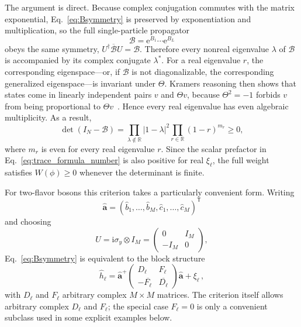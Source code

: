 \documentclass[twocolumn,aps,prb,10pt,amsmath,amssymb,amsthm,superscriptaddress]{revtex4-2}
\newcommand{\ee}{\mathrm{e}}
\newcommand{\ii}{\mathrm{i}}
\newcommand{\trans}{\mathsf{T}}
\newcommand{\hc}{\dagger}
\newcommand{\mc}[1]{\mathcal{#1}}
\newcommand{\bb}[1]{\bm{#1}}
\theoremstyle{remark}
\begin{document}
The argument is direct. Because complex conjugation commutes with the matrix exponential, Eq.~\eqref{eq:Bsymmetry} is preserved by exponentiation and multiplication, so the full single-particle propagator
\begin{equation}
    \mc B = \ee^{B_1}\cdots\ee^{B_L}
\end{equation}
obeys the same symmetry, $U^\hc\overline{\mc B}U=\mc B$. Therefore every nonreal eigenvalue $\lambda$ of $\mc B$ is accompanied by its complex conjugate $\lambda^*$. For a real eigenvalue $r$, the corresponding eigenspace---or, if $\mc B$ is not diagonalizable, the corresponding generalized eigenspace---is invariant under $\Theta$. Kramers reasoning then shows that states come in linearly independent pairs $v$ and $\Theta v$, because $\Theta^2=-1$ forbids $v$ from being proportional to $\Theta v$~\cite{sakurai2017modern}. Hence every real eigenvalue has even algebraic multiplicity. As a result,
\begin{equation}
    \det(I_N-\mc B)
    = \prod_{\lambda\notin\mathbb R} |1-\lambda|^2
      \prod_{r\in\mathbb R} (1-r)^{m_r}
    \ge 0,
    \label{eq:det_nonnegative}
\end{equation}
where $m_r$ is even for every real eigenvalue $r$. Since the scalar prefactor in Eq.~\eqref{eq:trace_formula_number} is also positive for real $\xi_\ell$, the full weight satisfies $W(\phi)\ge0$ whenever the determinant is finite.

For two-flavor bosons this criterion takes a particularly convenient form. Writing
\begin{equation}
    \hat{\bb a} = (\hat b_1,\ldots,\hat b_M,\hat c_1,\ldots,\hat c_M)^\trans
\end{equation}
and choosing
\begin{equation}
    U = \ii\sigma_y\otimes I_M =
    \begin{pmatrix}
        0 & I_M \\
        -I_M & 0
    \end{pmatrix},
\end{equation}
Eq.~\eqref{eq:Bsymmetry} is equivalent to the block structure
\begin{equation}
    \hat h_\ell =
    \hat{\bb a}^+
    \begin{pmatrix}
        D_\ell & F_\ell \\
        -\overline{F_\ell} & \overline{D_\ell}
    \end{pmatrix}
    \hat{\bb a}
    + \xi_\ell \,,
    \label{eq:block_TRS}
\end{equation}
with $D_\ell$ and $F_\ell$ arbitrary complex $M\times M$ matrices. The criterion itself allows arbitrary complex $D_\ell$ and $F_\ell$; the special case $F_\ell=0$ is only a convenient subclass used in some explicit examples below. 
\end{document}
